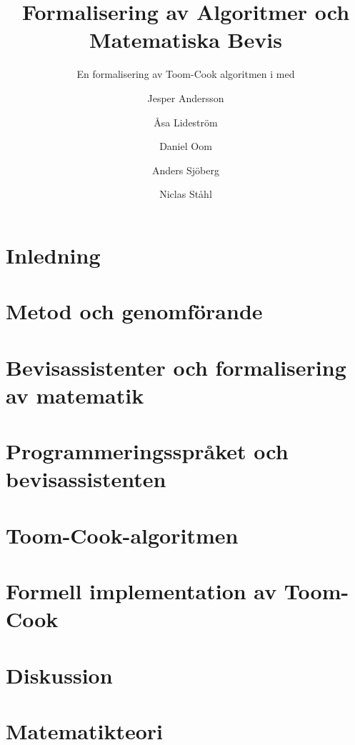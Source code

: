 \documentclass[bachelors,a4paper,gu]{chalmers-thesis}
\title{Formalisering av Algoritmer och Matematiska Bevis}
\subtitle{En formalisering av Toom-Cook algoritmen i \coq{} med \ssr{}}
\author{Jesper Andersson\and Åsa Lideström\and Daniel Oom\and Anders Sjöberg\and Niclas Ståhl}
\begin{document}
\maketitle

\chapter{Inledning}
\label{sec:inledning}


\newpage
\chapter{Metod och genomförande}
\label{sec:metod}


\newpage
\chapter{Bevisassistenter och formalisering av matematik}
\label{sec:formalisering}


\newpage
\chapter{Programmeringsspråket och bevisassistenten \coq}
\label{sec:coq}







\newpage
\chapter{Toom-Cook-algoritmen}
\label{sec:toomcook}






\newpage
\chapter{Formell implementation av Toom-Cook}
\label{sec:formell}



\newpage
\chapter{Diskussion}
\label{sec:diskussion}







\newpage
\nocite{*}
\printbibliography

\appendix
\newpage
\chapter{Matematikteori}



\end{document}
